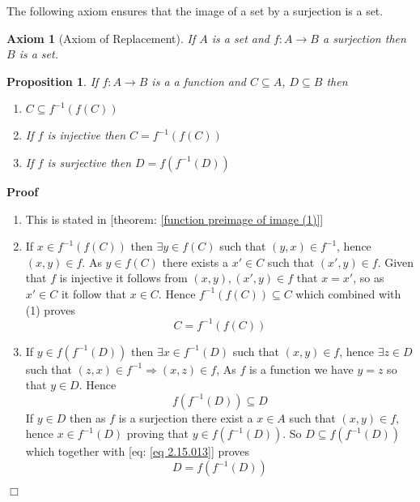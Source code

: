\documentclass{book}
\newenvironment{proof}{\noindent\textbf{Proof\ }}{\hspace*{\fill}$\Box$\medskip}
\newtheorem{axiom}{Axiom}
{\theorembodyfont{\rmfamily}\newtheorem{convention}{Convention}}
\newtheorem{proposition}{Proposition}
{\theorembodyfont{\rmfamily}\newtheorem{remark}{Remark}}
\begin{document}
The following axiom ensures that the image of a set by a surjection is a set.

\begin{axiom}[Axiom of Replacement]
  \label{Axiom of Replacement}If $A$ is a set and $f : A \rightarrow B$ a
  surjection then $B$ is a set.
\end{axiom}

\begin{proposition}
  \label{function preimage of image}If $f : A \rightarrow B$ is a a function
  and $C \subseteq A$, $D \subseteq B$ then
  \begin{enumerate}
    \item $C \subseteq f^{- 1} (f (C))$
    
    \item If $f$ is injective then $C = f^{- 1} (f (C))$
    
    \item If $f$ is surjective then $D = f (f^{- 1} (D))$
  \end{enumerate}
\end{proposition}

\begin{proof}
  
  \begin{enumerate}
    \item This is stated in [theorem: \ref{function preimage of image (1)}]
    
    \item If $x \in f^{- 1} (f (C))$ then $\exists y \in f (C)$ such that $(y,
    x) \in f^{- 1}$, hence $(x, y) \in f$. As $y \in f (C)$ there exists a $x'
    \in C$ such that $(x', y) \in f$. Given that $f$ is injective it follows
    from $(x, y), (x', y) \in f$ that $x = x'$, so as $x' \in C$ it follow
    that $x \in C$. Hence $f^{- 1} (f (C)) \subseteq C$ which combined with
    (1) proves
    \[ C = f^{- 1} (f (C)) \]
    \item If $y \in f (f^{- 1} (D))$ then $\exists x \in f^{- 1} (D)$ such
    that $(x, y) \in f$, hence $\exists z \in D$ such that $(z, x) \in f^{- 1}
    \Rightarrow (x, z) \in f$, As $f$ is a function we have $y = z$ so that $y
    \in D$. Hence
    \begin{equation}
      \label{eq 2.15.013} f (f^{- 1} (D)) \subseteq D
    \end{equation}
    If $y \in D$ then as $f$ is a surjection there exist a $x \in A$ such that
    $(x, y) \in f$, hence $x \in f^{- 1} (D)$ proving that $y \in f (f^{- 1}
    (D))$. So $D \subseteq f (f^{- 1} (D))$ which together with [eq: \ref{eq
    2.15.013}] proves
    \[ D = f (f^{- 1} (D)) \]
  \end{enumerate}
\end{proof}
\end{document}
